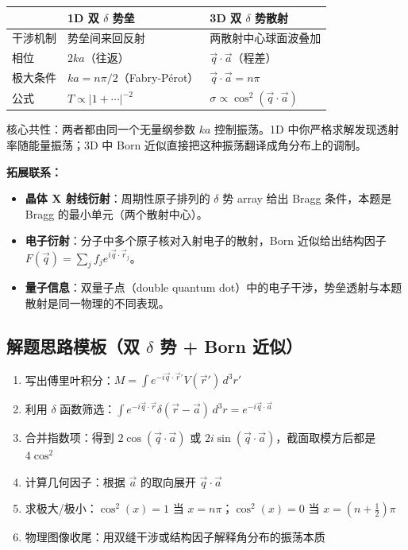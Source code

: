 \begin{insightbox}[举一反三与物理直觉]
\begin{center}
\begin{tabular}{|l|l|l|}
\hline
& \textbf{1D 双 $\delta$ 势垒} & \textbf{3D 双 $\delta$ 势散射} \\
\hline
干涉机制 & 势垒间来回反射 & 两散射中心球面波叠加 \\
相位 & $2ka$（往返） & $\vec{q}\cdot\vec{a}$（程差） \\
极大条件 & $ka = n\pi/2$（Fabry-P\'{e}rot） & $\vec{q}\cdot\vec{a} = n\pi$ \\
公式 & $T \propto |1 + \cdots|^{-2}$ & $\sigma \propto \cos^2(\vec{q}\cdot\vec{a})$ \\
\hline
\end{tabular}
\end{center}

核心共性：两者都由同一个无量纲参数 $ka$ 控制振荡。1D 中你严格求解发现透射率随能量振荡；3D 中 Born 近似直接把这种振荡翻译成角分布上的调制。

\textbf{拓展联系：}
\begin{itemize}
    \item \textbf{晶体 X 射线衍射}：周期性原子排列的 $\delta$ 势 array 给出 Bragg 条件，本题是 Bragg 的最小单元（两个散射中心）。
    \item \textbf{电子衍射}：分子中多个原子核对入射电子的散射，Born 近似给出结构因子 $F(\vec{q}) = \sum_j f_j e^{i\vec{q}\cdot\vec{r}_j}$。
    \item \textbf{量子信息}：双量子点（double quantum dot）中的电子干涉，势垒透射与本题散射是同一物理的不同表现。
\end{itemize}
\end{insightbox}

\subsection{解题思路模板（双 $\delta$ 势 + Born 近似）}

\begin{thinkbox}
\begin{enumerate}
    \item 写出傅里叶积分：$M = \int e^{-i\vec{q}\cdot\vec{r}'} V(\vec{r}')\,d^3r'$
    \item 利用 $\delta$ 函数筛选：$\int e^{-i\vec{q}\cdot\vec{r}}\delta(\vec{r}-\vec{a})\,d^3r = e^{-i\vec{q}\cdot\vec{a}}$
    \item 合并指数项：得到 $2\cos(\vec{q}\cdot\vec{a})$ 或 $2i\sin(\vec{q}\cdot\vec{a})$，截面取模方后都是 $4\cos^2$
    \item 计算几何因子：根据 $\vec{a}$ 的取向展开 $\vec{q}\cdot\vec{a}$
    \item 求极大/极小：$\cos^2(x) = 1$ 当 $x = n\pi$；$\cos^2(x) = 0$ 当 $x = (n+\frac{1}{2})\pi$
    \item 物理图像收尾：用双缝干涉或结构因子解释角分布的振荡本质
\end{enumerate}
\end{thinkbox}
